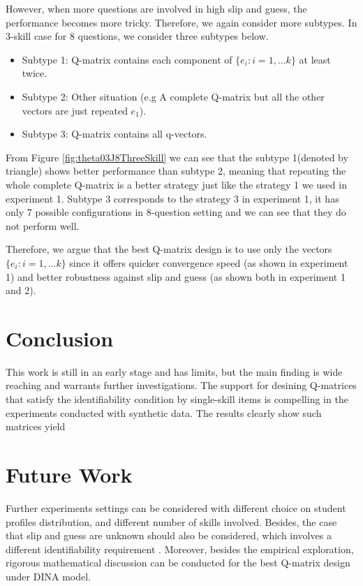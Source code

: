 \documentclass{edm_template}
\begin{document}
However, when more questions are involved in high slip and guess, the performance becomes more tricky. Therefore, we again consider more subtypes. In 3-skill case for 8 questions, we consider three subtypes below. 
\begin{itemize}
\item Subtype 1: Q-matrix contains each component of $\{e_{i}:i=1,...k\}$ at least twice. 
\item Subtype 2: Other situation (e.g A complete Q-matrix but all the other vectors are just repeated $e_1$).
\item Subtype 3: Q-matrix contains all q-vectors.
\end{itemize}
From Figure \ref{fig:theta03J8ThreeSkill} we can see that the subtype 1(denoted by triangle) shows better performance than subtype 2, meaning that repeating the whole complete Q-matrix is a better strategy just like the strategy 1 we used in experiment 1. Subtype 3 corresponds to the strategy 3 in experiment 1, it has only 7 possible configurations in 8-question setting and we can see that they do not perform well.

Therefore, we argue that the best Q-matrix design is to use only the vectors $\{e_{i}:i=1,...k\}$ since it offers quicker convergence speed (as shown in experiment 1) and better robustness against slip and guess (as shown both in experiment 1 and 2).

\section{Conclusion}

This work is still in an early stage and has limits, but the main finding is wide reaching and warrants further investigations.  The support for desining Q-matrices that satisfy the identifiability condition by single-skill items is compelling in the experiments conducted with synthetic data.  The results clearly show such matrices yield 

\section{Future Work}
Further experiments settings can be considered with different choice on student profiles distribution, and different number of skills involved. Besides, the case that slip and guess are unknown should also be considered, which involves a different identifiability requirement \cite{xu2015identifiability}. Moreover, besides the empirical exploration, rigorous mathematical discussion can be conducted for the best Q-matrix design under DINA model. 


\end{document}
